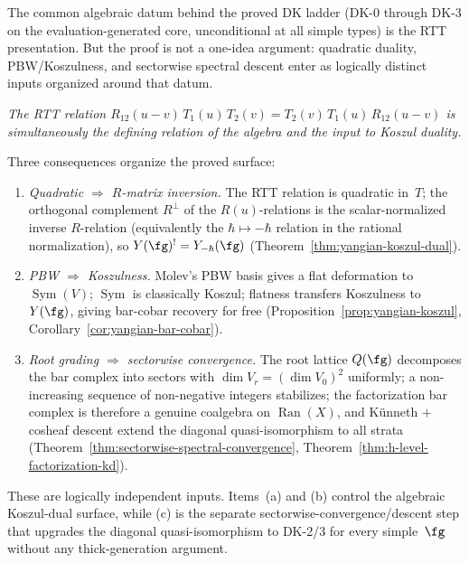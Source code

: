 \begin{remark}
\label{rem:rtt-is-the-duality-datum}
The common algebraic datum behind the proved DK ladder
\textup{(}DK-0 through DK-3 on the evaluation-generated core,
unconditional at all simple types\textup{)} is the RTT presentation.
But the proof is not a one-idea argument: quadratic duality,
PBW/Koszulness, and sectorwise spectral descent enter as
logically distinct inputs organized around that datum.
\smallskip
\begin{center}
\emph{The RTT relation
$R_{12}(u\!-\!v)\,T_1(u)\,T_2(v)
= T_2(v)\,T_1(u)\,R_{12}(u\!-\!v)$
is simultaneously the defining relation of the algebra
and the input to Koszul duality.}
\end{center}

\smallskip\noindent
Three consequences organize the proved surface:
\begin{enumerate}[label=\textup{(\alph*)}]
\item \emph{Quadratic $\Rightarrow$ $R$-matrix inversion.}
 The RTT relation is quadratic in~$T$; the orthogonal complement
 $R^\perp$ of the $R(u)$-relations is the scalar-normalized
 inverse $R$-relation \textup{(}equivalently the
 $\hbar\mapsto-\hbar$ relation in the rational normalization\textup{)},
 so $Y(\fg)^! = Y_{-\hbar}(\fg)$
 (Theorem~\ref{thm:yangian-koszul-dual}).

\item \emph{PBW $\Rightarrow$ Koszulness.}
 Molev's PBW basis gives a flat deformation to
 $\operatorname{Sym}(V)$; $\operatorname{Sym}$ is classically
 Koszul; flatness transfers Koszulness to~$Y(\fg)$, giving
 bar-cobar recovery for free
 (Proposition~\ref{prop:yangian-koszul},
 Corollary~\ref{cor:yangian-bar-cobar}).

\item \emph{Root grading $\Rightarrow$ sectorwise convergence.}
 The root lattice $Q(\fg)$ decomposes the bar complex into sectors
 with $\dim V_r = (\dim V_0)^2$ uniformly; a non-increasing
 sequence of non-negative integers stabilizes; the factorization
 bar complex is therefore a genuine coalgebra on
 $\operatorname{Ran}(X)$, and K\"unneth $+$ cosheaf descent extend
 the diagonal quasi-isomorphism to all strata
 (Theorem~\ref{thm:sectorwise-spectral-convergence},
 Theorem~\ref{thm:h-level-factorization-kd}).
\end{enumerate}
These are logically independent inputs. Items~\textup{(a)} and
\textup{(b)} control the algebraic Koszul-dual surface, while
\textup{(c)} is the separate sectorwise-convergence/descent step
that upgrades the diagonal quasi-isomorphism to DK-2/3 for every
simple~$\fg$ without any thick-generation argument.


\end{remark}
